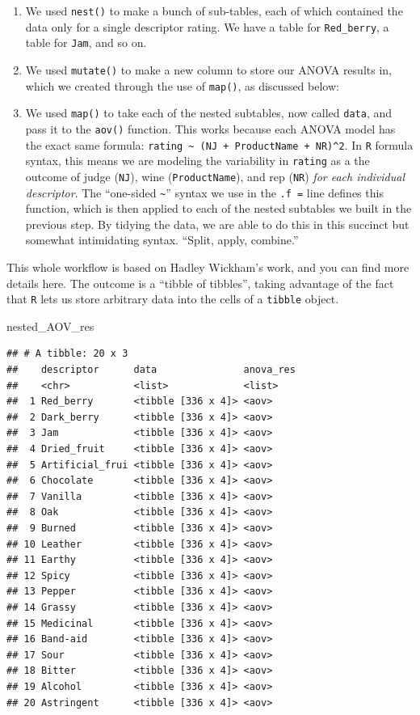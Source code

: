\documentclass[
]{book}
\newenvironment{Shaded}{\begin{snugshade}}{\end{snugshade}}
\newcommand{\NormalTok}[1]{#1}
\providecommand{\tightlist}{%
  \setlength{\itemsep}{0pt}\setlength{\parskip}{0pt}}
\begin{document}
\begin{enumerate}
\def\labelenumi{\arabic{enumi}.}
\tightlist
\item
  We used \texttt{nest()} to make a bunch of sub-tables, each of which contained the data only for a single descriptor rating. We have a table for \texttt{Red\_berry}, a table for \texttt{Jam}, and so on.
\item
  We used \texttt{mutate()} to make a new column to store our ANOVA results in, which we created through the use of \texttt{map()}, as discussed below:
\item
  We used \texttt{map()} to take each of the nested subtables, now called \texttt{data}, and pass it to the \texttt{aov()} function. This works because each ANOVA model has the exact same formula: \texttt{rating\ \textasciitilde{}\ (NJ\ +\ ProductName\ +\ NR)\^{}2}. In \texttt{R} formula syntax, this means we are modeling the variability in \texttt{rating} as a the outcome of judge (\texttt{NJ}), wine (\texttt{ProductName}), and rep (\texttt{NR}) \emph{for each individual descriptor}. The ``one-sided \texttt{\textasciitilde{}}'' syntax we use in the \texttt{.f\ =} line defines this function, which is then applied to each of the nested subtables we built in the previous step. By tidying the data, we are able to do this in this succinct but somewhat intimidating syntax. ``Split, apply, combine.''
\end{enumerate}

This whole workflow is based on Hadley Wickham's work, and you can find more details here. The outcome is a ``tibble of tibbles'', taking advantage of the fact that \texttt{R} lets us store arbitrary data into the cells of a \texttt{tibble} object.

\begin{Shaded}
\begin{Highlighting}[]
\NormalTok{nested\_AOV\_res}
\end{Highlighting}
\end{Shaded}

\begin{verbatim}
## # A tibble: 20 x 3
##    descriptor      data               anova_res
##    <chr>           <list>             <list>   
##  1 Red_berry       <tibble [336 x 4]> <aov>    
##  2 Dark_berry      <tibble [336 x 4]> <aov>    
##  3 Jam             <tibble [336 x 4]> <aov>    
##  4 Dried_fruit     <tibble [336 x 4]> <aov>    
##  5 Artificial_frui <tibble [336 x 4]> <aov>    
##  6 Chocolate       <tibble [336 x 4]> <aov>    
##  7 Vanilla         <tibble [336 x 4]> <aov>    
##  8 Oak             <tibble [336 x 4]> <aov>    
##  9 Burned          <tibble [336 x 4]> <aov>    
## 10 Leather         <tibble [336 x 4]> <aov>    
## 11 Earthy          <tibble [336 x 4]> <aov>    
## 12 Spicy           <tibble [336 x 4]> <aov>    
## 13 Pepper          <tibble [336 x 4]> <aov>    
## 14 Grassy          <tibble [336 x 4]> <aov>    
## 15 Medicinal       <tibble [336 x 4]> <aov>    
## 16 Band-aid        <tibble [336 x 4]> <aov>    
## 17 Sour            <tibble [336 x 4]> <aov>    
## 18 Bitter          <tibble [336 x 4]> <aov>    
## 19 Alcohol         <tibble [336 x 4]> <aov>    
## 20 Astringent      <tibble [336 x 4]> <aov>
\end{verbatim}
\end{document}
